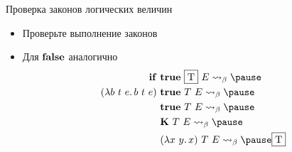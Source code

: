     \begin{frame}[fragile]{Проверка законов логических величин}
        \begin{itemize}
            \item[\todo] Проверьте выполнение законов
            \item[\answer] \pause Для $\mathbf{false}$ аналогично
            \begin{align*}
                \term{if} \ap &\term{true} \ap \framebox{T} \ap E
                \step_{\beta} \pause \\
                (\lambda b~t~e\ldotp b \ap t \ap e) \ap &\term{true} \ap T \ap E
                \step_{\beta} \pause \\
                &\term{true} \ap T \ap E
                \step_{\beta} \pause \\
                &\term{K} \ap T \ap E
                \step_{\beta} \pause \\
                &(\lambda x~y\ldotp x) \ap T \ap E
                \step_{\beta} \pause
                \framebox{T}
            \end{align*}
        \end{itemize}
    \end{frame}

